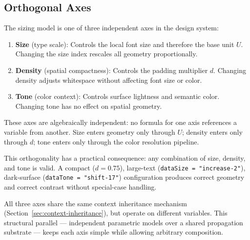 \subsection{Orthogonal Axes}
\label{sec:orthogonality}

The sizing model is one of three independent axes in the design system:

\begin{enumerate}
  \item \textbf{Size} (type scale): Controls the local font size and therefore the base unit $U$. Changing the size index rescales all geometry proportionally.

  \item \textbf{Density} (spatial compactness): Controls the padding multiplier $d$. Changing density adjusts whitespace without affecting font size or color.

  \item \textbf{Tone} (color context): Controls surface lightness and semantic color. Changing tone has no effect on spatial geometry.
\end{enumerate}

These axes are algebraically independent: no formula for one axis references a variable from another. Size enters geometry only through $U$; density enters only through $d$; tone enters only through the color resolution pipeline.

This orthogonality has a practical consequence: any combination of size, density, and tone is valid. A compact ($d = 0.75$), large-text (\texttt{dataSize = "increase-2"}), dark-surface (\texttt{dataTone = "shift-17"}) configuration produces correct geometry and correct contrast without special-case handling.

All three axes share the same context inheritance mechanism (Section~\ref{sec:context-inheritance}), but operate on different variables. This structural parallel --- independent parametric models over a shared propagation substrate --- keeps each axis simple while allowing arbitrary composition.
